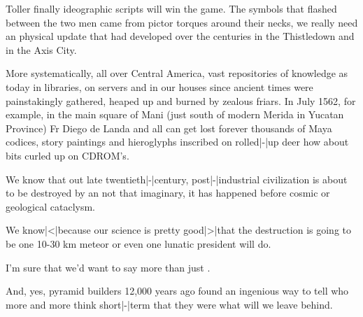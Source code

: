 \StopIdea

\StartIdea
    [ title={Greg Bear},
     remark={Eon, p. 258, 1985}]

 Toller
 {finally ideographic scripts will win the game}. The symbols
that flashed between the two men came from pictor torques around their necks,
 {we really need an physical update} that had developed over the
centuries in the Thistledown and in the Axis City.

\StopIdea

\StartIdea
    [ title={Graham Hancock},
     remark={Fingerprints of the gods, Graham Hancock, p. 120, 1995}]

More systematically, all over Central America, vast repositories of knowledge
 {as today in libraries, on servers and in our houses} since
ancient times were painstakingly gathered, heaped up and burned by zealous
friars. In July 1562, for example, in the main square of Mani (just south of
modern Merida in Yucatan Province) Fr Diego de Landa  {and all
can get lost forever} thousands of Maya codices, story paintings and hieroglyphs
inscribed on rolled|-|up deer  {how about bits curled up on
CDROM's}.

\StopIdea

\StartIdea
    [ title={Graham Hancock},
     remark={Fingerprints of the gods, Graham Hancock, p. 520/526, 1995}]

We know that out late twentieth|-|century, post|-|industrial civilization is
about to be destroyed by an  {not that imaginary, it has
happened before} cosmic or geological cataclysm.

We know|<|because our science is pretty good|>|that the destruction is going to
be  {one 10-30 km meteor or even one lunatic
president will do}.

\blank \unknown \blank

I'm sure that we'd want to say more than just .

\blank \unknown \blank

And, yes,  {pyramid builders 12,000 years ago} found an ingenious
way to tell  {who more and more think short|-|term} that they were
 {what will we leave behind}.

\StopIdea

\StartIdea
    [ title={Jared Diamond},
     remark={Guns, Germs and Steel, A Short History of Everybody for the Last
             13,000 years, p. 260, 1997}]

